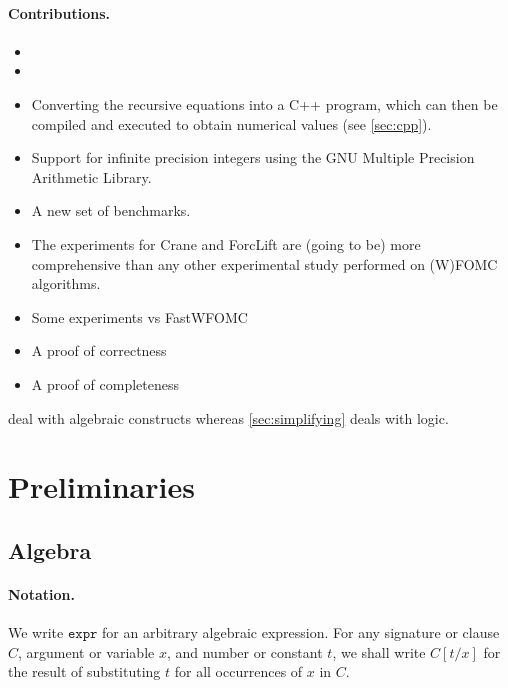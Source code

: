 \documentclass{article}
\newcommand{\expr}{\mathtt{expr}}
\begin{document}
\paragraph{Contributions.}
\begin{itemize}
  \item {}
  \item {}
  \item Converting the recursive equations into a C++ program, which can then be
        compiled and executed to obtain numerical values (see \cref{sec:cpp}).
  \item Support for infinite precision integers using the GNU Multiple Precision
        Arithmetic Library.
  \item A new set of benchmarks.
  \item The experiments for Crane and ForcLift are (going to be) more
        comprehensive than any other experimental study performed on (W)FOMC
        algorithms.
  \item Some experiments vs FastWFOMC
  \item A proof of correctness
  \item A proof of completeness
\end{itemize}


 deal with algebraic constructs whereas
\cref{sec:simplifying} deals with logic.

\section{Preliminaries}

\subsection{Algebra}

\paragraph{Notation.}
We write $\expr{}$ for an arbitrary algebraic expression. For any signature or
clause $C$, argument or variable $x$, and number or constant $t$, we shall write
$C[t / x]$ for the result of substituting $t$ for all occurrences of $x$ in $C$.

\end{document}
